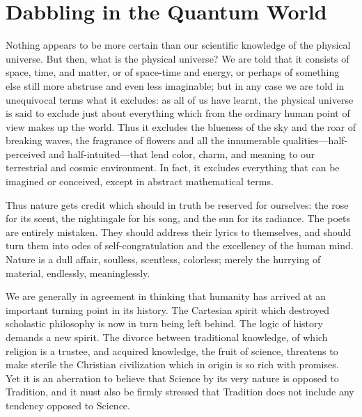 \section{Dabbling in the Quantum World}

\begin{quotex}
Nothing appears to be more certain than our scientific knowledge of the physical universe. But then, what is the physical universe? We are told that it consists of space, time, and matter, or of space-time and energy, or perhaps of something else still more abstruse and even less imaginable; but in any case we are told in unequivocal terms what it excludes: as all of us have learnt, the physical universe is said to exclude just about everything which from the ordinary human point of view makes up the world. Thus it excludes the blueness of the sky and the roar of breaking waves, the fragrance of flowers and all the innumerable qualities---half-perceived and half-intuited---that lend color, charm, and meaning to our terrestrial and cosmic environment. In fact, it excludes everything that can be imagined or conceived, except in abstract mathematical terms.

Thus nature gets credit which should in truth be reserved for ourselves: the rose for its scent, the nightingale for his song, and the sun for its radiance. The poets are entirely mistaken. They should address their lyrics to themselves, and should turn them into odes of self-congratulation and the excellency of the human mind. Nature is a dull affair, soulless, scentless, colorless; merely the hurrying of material, endlessly, meaninglessly.

We are generally in agreement in thinking that humanity has arrived at an important turning point in its history. The Cartesian spirit which destroyed scholastic philosophy is now in turn being left behind. The logic of history demands a new spirit. The divorce between traditional knowledge, of which religion is a trustee, and acquired knowledge, the fruit of science, threatens to make sterile the Christian civilization which in origin is so rich with promises. Yet it is an aberration to believe that Science by its very nature is opposed to Tradition, and it must also be firmly stressed that Tradition does not include any tendency opposed to Science.
\end{quotex}


